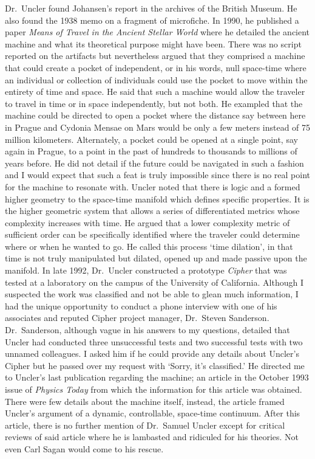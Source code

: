 Dr.~Uncler found Johansen's report in the archives of the British
Museum. He also found the 1938 memo on a fragment of microfiche. In
1990, he published a paper \emph{Means of Travel in the Ancient Stellar
World} where he detailed the ancient machine and what its theoretical
purpose might have been. There was no script reported on the artifacts
but nevertheless argued that they comprised a machine that could create
a pocket of independent, or in his words, null space-time where an
individual or collection of individuals could use the pocket to move
within the entirety of time and space. He said that such a machine would
allow the traveler to travel in time or in space independently, but not
both. He exampled that the machine could be directed to open a pocket
where the distance say between here in Prague and Cydonia Mensae on Mars
would be only a few meters instead of 75 million kilometers.
Alternately, a pocket could be opened at a single point, say again in
Prague, to a point in the past of hundreds to thousands to millions of
years before. He did not detail if the future could be navigated in such
a fashion and I would expect that such a feat is truly impossible since
there is no real point for the machine to resonate with. Uncler noted
that there is logic and a formed higher geometry to the space-time
manifold which defines specific properties. It is the higher geometric
system that allows a series of differentiated metrics whose complexity
increases with time. He argued that a lower complexity metric of
sufficient order can be specifically identified where the traveler could
determine where or when he wanted to go. He called this process `time
dilation', in that time is not truly manipulated but dilated, opened up
and made passive upon the manifold. In late 1992, Dr.~Uncler constructed
a prototype \emph{Cipher} that was tested at a laboratory on the campus
of the University of California. Although I suspected the work was
classified and not be able to glean much information, I had the unique
opportunity to conduct a phone interview with one of his associates and
reputed Cipher project manager, Dr.~Steven Sanderson. Dr.~Sanderson,
although vague in his answers to my questions, detailed that Uncler had
conducted three unsuccessful tests and two successful tests with two
unnamed colleagues. I asked him if he could provide any details about
Uncler's Cipher but he passed over my request with `Sorry, it's
classified.' He directed me to Uncler's last publication regarding the
machine; an article in the October 1993 issue of \emph{Physics Today}
from which the information for this article was obtained. There were few
details about the machine itself, instead, the article framed Uncler's
argument of a dynamic, controllable, space-time continuum. After this
article, there is no further mention of Dr.~Samuel Uncler except for
critical reviews of said article where he is lambasted and ridiculed for
his theories. Not even Carl Sagan would come to his rescue.

